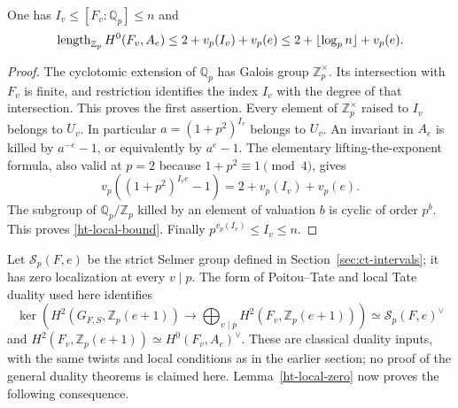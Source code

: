 \begin{lemma}\label{ht-local-zero}
One has $I_v\le[F_v:\mathbb Q_p]\le n$ and
\begin{equation}\label{ht-local-bound}
 \operatorname{length}_{\mathbb Z_p}H^0(F_v,A_e)
       \le2+v_p(I_v)+v_p(e)
       \le2+\lfloor\log_p n\rfloor+v_p(e).
\end{equation}
\end{lemma}
\begin{proof}
The cyclotomic extension of $\mathbb Q_p$ has Galois group
$\mathbb Z_p^\times$.  Its intersection with $F_v$ is finite,
and restriction identifies the index $I_v$ with the degree
of that intersection.  This proves the first assertion.
Every element of $\mathbb Z_p^\times$ raised to $I_v$
belongs to $U_v$.  In particular
$a=(1+p^2)^{I_v}$ belongs to $U_v$.  An invariant in $A_e$
is killed by $a^{-e}-1$, or equivalently by $a^e-1$.
The elementary lifting-the-exponent formula, also valid at
$p=2$ because $1+p^2\equiv1\pmod4$, gives
\[
             v_p((1+p^2)^{I_ve}-1)=2+v_p(I_v)+v_p(e).
\]
The subgroup of $\mathbb Q_p/\mathbb Z_p$ killed by an element
of valuation $b$ is cyclic of order $p^b$.  This proves
\eqref{ht-local-bound}.  Finally $p^{v_p(I_v)}\le I_v\le n$.
\end{proof}

Let $\mathcal S_p(F,e)$ be the strict Selmer group defined in
Section~\ref{sec:ct-intervals}; it has zero localization at every
$v\mid p$.  The form of Poitou--Tate and local Tate duality
used here identifies
\[
 \ker\!\left(H^2(G_{F,S},\mathbb Z_p(e+1))
              \longrightarrow
              \bigoplus_{v\mid p}H^2(F_v,\mathbb Z_p(e+1))\right)
          \simeq \mathcal S_p(F,e)^\vee
\]
and $H^2(F_v,\mathbb Z_p(e+1))\simeq H^0(F_v,A_e)^\vee$.
These are classical duality inputs, with the same twists
and local conditions as in the earlier section; no proof of
the general duality theorems is claimed here.
Lemma~\ref{ht-local-zero} now proves the following consequence.

